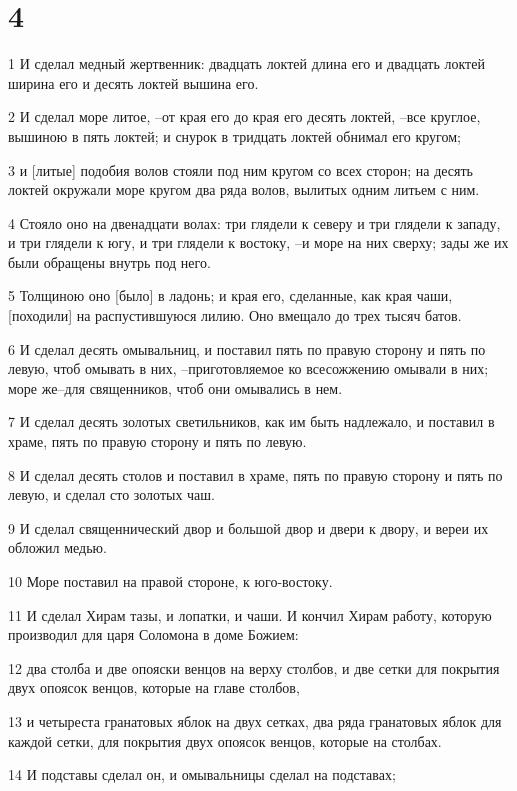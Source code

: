 \chapter{4}

\par 1 И сделал медный жертвенник: двадцать локтей длина его и двадцать локтей ширина его и десять локтей вышина его.
\par 2 И сделал море литое, --от края его до края его десять локтей, --все круглое, вышиною в пять локтей; и снурок в тридцать локтей обнимал его кругом;
\par 3 и [литые] подобия волов стояли под ним кругом со всех сторон; на десять локтей окружали море кругом два ряда волов, вылитых одним литьем с ним.
\par 4 Стояло оно на двенадцати волах: три глядели к северу и три глядели к западу, и три глядели к югу, и три глядели к востоку, --и море на них сверху; зады же их были обращены внутрь под него.
\par 5 Толщиною оно [было] в ладонь; и края его, сделанные, как края чаши, [походили] на распустившуюся лилию. Оно вмещало до трех тысяч батов.
\par 6 И сделал десять омывальниц, и поставил пять по правую сторону и пять по левую, чтоб омывать в них, --приготовляемое ко всесожжению омывали в них; море же--для священников, чтоб они омывались в нем.
\par 7 И сделал десять золотых светильников, как им быть надлежало, и поставил в храме, пять по правую сторону и пять по левую.
\par 8 И сделал десять столов и поставил в храме, пять по правую сторону и пять по левую, и сделал сто золотых чаш.
\par 9 И сделал священнический двор и большой двор и двери к двору, и вереи их обложил медью.
\par 10 Море поставил на правой стороне, к юго-востоку.
\par 11 И сделал Хирам тазы, и лопатки, и чаши. И кончил Хирам работу, которую производил для царя Соломона в доме Божием:
\par 12 два столба и две опояски венцов на верху столбов, и две сетки для покрытия двух опоясок венцов, которые на главе столбов,
\par 13 и четыреста гранатовых яблок на двух сетках, два ряда гранатовых яблок для каждой сетки, для покрытия двух опоясок венцов, которые на столбах.
\par 14 И подставы сделал он, и омывальницы сделал на подставах;
